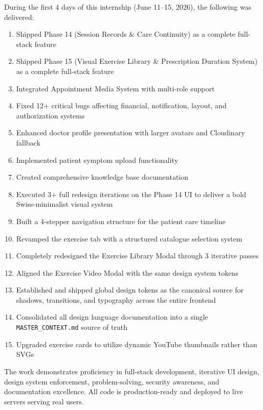 \documentclass[11pt,a4paper]{article}
\begin{document}
During the first 4 days of this internship (June 11--15, 2026), the following was
delivered:

\begin{enumerate}
  \item Shipped Phase 14 (Session Records \& Care Continuity) as a complete full-stack feature
  \item Shipped Phase 15 (Visual Exercise Library \& Prescription Duration System) as a complete full-stack feature
  \item Integrated Appointment Media System with multi-role support
  \item Fixed 12+ critical bugs affecting financial, notification, layout, and authorization systems
  \item Enhanced doctor profile presentation with larger avatars and Cloudinary fallback
  \item Implemented patient symptom upload functionality
  \item Created comprehensive knowledge base documentation
  \item Executed 3+ full redesign iterations on the Phase 14 UI to deliver a bold
        Swiss-minimalist visual system
  \item Built a 4-stepper navigation structure for the patient care timeline
  \item Revamped the exercise tab with a structured catalogue selection system
  \item Completely redesigned the Exercise Library Modal through 3 iterative passes
  \item Aligned the Exercise Video Modal with the same design system tokens
  \item Established and shipped global design tokens as the canonical source for shadows,
        transitions, and typography across the entire frontend
  \item Consolidated all design language documentation into a single
        \texttt{MASTER\_CONTEXT.md} source of truth
  \item Upgraded exercise cards to utilize dynamic YouTube thumbnails rather than SVGs
\end{enumerate}

The work demonstrates proficiency in full-stack development, iterative UI design,
design system enforcement, problem-solving, security awareness, and documentation
excellence. All code is production-ready and deployed to live servers serving real users.

\vspace{1.5em}
\end{document}
